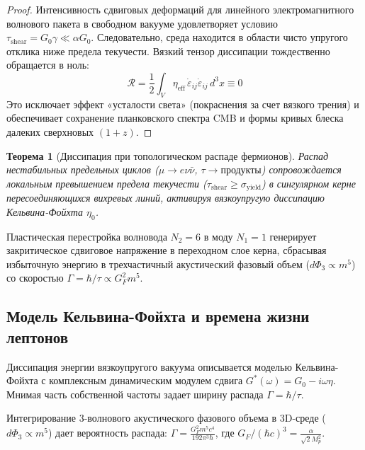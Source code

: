 \documentclass[12pt,a4paper]{article}
\newtheorem{theorem}{Теорема}
\begin{document}
	\begin{proof}
		Интенсивность сдвиговых деформаций для линейного электромагнитного волнового пакета в свободном вакууме удовлетворяет условию $\tau_{\text{shear}} = G_0 \gamma \ll \alpha G_0$. Следовательно, среда находится в области чисто упругого отклика ниже предела текучести. Вязкий тензор диссипации тождественно обращается в ноль:
		\begin{equation}
			\mathcal{R} = \frac{1}{2} \int_V \eta_{\text{eff}} \, \dot{\varepsilon}_{ij} \dot{\varepsilon}_{ij} \, d^3x \equiv 0
		\end{equation}
		Это исключает эффект «усталости света» (покраснения за счет вязкого трения) и обеспечивает сохранение планковского спектра CMB и формы кривых блеска далеких сверхновых $(1+z)$.
	\end{proof}
	
	\begin{theorem}[Диссипация при топологическом распаде фермионов]
		Распад нестабильных предельных циклов ($\mu \to e\nu\bar{\nu}$, $\tau \to \text{продукты}$) сопровождается локальным превышением предела текучести ($\tau_{\mathrm{shear}} \ge \sigma_{\mathrm{yield}}$) в сингулярном керне пересоединяющихся вихревых линий, активируя вязкоупругую диссипацию Кельвина-Фойхта $\eta_0$.
	\end{theorem}
	
	Пластическая перестройка волновода $N_2=6$ в моду $N_1=1$ генерирует закритическое сдвиговое напряжение в переходном слое керна, сбрасывая избыточную энергию в трехчастичный акустический фазовый объем ($d\Phi_3 \propto m^5$) со скоростью $\Gamma = \hbar/\tau \propto G_F^2 m^5$.
	
	\subsection{Модель Кельвина-Фойхта и времена жизни лептонов}
	Диссипация энергии вязкоупругого вакуума описывается моделью Кельвина-Фойхта с комплексным динамическим модулем сдвига $G^*(\omega) = G_0 - i\omega\eta$. Мнимая часть собственной частоты задает ширину распада $\Gamma = \hbar/\tau$.
	
	Интегрирование 3-волнового акустического фазового объема в 3D-среде ($d\Phi_3 \propto m^5$) дает вероятность распада: $\Gamma = \frac{G_F^2 m^5 c^4}{192 \pi^3 \hbar}$, где $G_F / (\hbar c)^3 = \frac{\alpha}{\sqrt{2} M_p^2}$.
	
\end{document}
